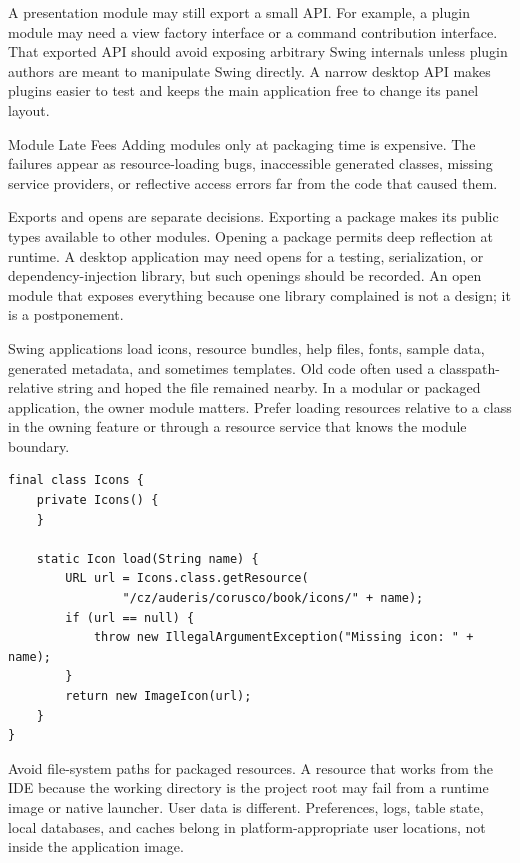 A presentation module may still export a small API. For example, a plugin module may need a view factory interface or a command contribution interface. That exported API should avoid exposing arbitrary Swing internals unless plugin authors are meant to manipulate Swing directly. A narrow desktop API makes plugins easier to test and keeps the main application free to change its panel layout.

\begin{pitfallbox}{Module Late Fees}
Adding modules only at packaging time is expensive. The failures appear as resource-loading bugs, inaccessible generated classes, missing service providers, or reflective access errors far from the code that caused them.
\end{pitfallbox}

Exports and opens are separate decisions. Exporting a package makes its public types available to other modules. Opening a package permits deep reflection at runtime. A desktop application may need opens for a testing, serialization, or dependency-injection library, but such openings should be recorded. An open module that exposes everything because one library complained is not a design; it is a postponement.

Swing applications load icons, resource bundles, help files, fonts, sample data, generated metadata, and sometimes templates. Old code often used a classpath-relative string and hoped the file remained nearby. In a modular or packaged application, the owner module matters. Prefer loading resources relative to a class in the owning feature or through a resource service that knows the module boundary.

\begin{lstlisting}[caption={Resource loading relative to the owning class.}]
final class Icons {
    private Icons() {
    }

    static Icon load(String name) {
        URL url = Icons.class.getResource(
                "/cz/auderis/corusco/book/icons/" + name);
        if (url == null) {
            throw new IllegalArgumentException("Missing icon: " + name);
        }
        return new ImageIcon(url);
    }
}
\end{lstlisting}

Avoid file-system paths for packaged resources. A resource that works from the IDE because the working directory is the project root may fail from a runtime image or native launcher. User data is different. Preferences, logs, table state, local databases, and caches belong in platform-appropriate user locations, not inside the application image.

